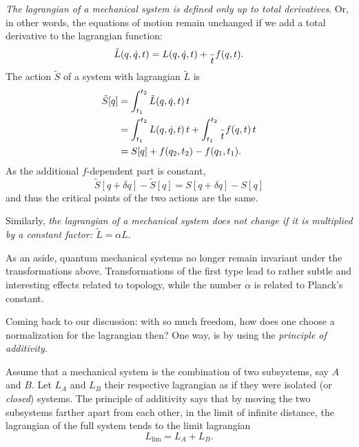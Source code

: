 \documentclass[english,fontsize=11pt,paper=a5,oneside]{scrbook}
\let\d\relax
\DeclareMathOperator{\d}{d}
\theoremstyle{definition}
\newenvironment{remark}
  {\pushQED{\qed}\renewcommand{\qedsymbol}{$\lozenge$}\remarkx}
  {\popQED\endremarkx}
\begin{document}
\begin{remark}\label{rmk:manylagrangians}
    \emph{The lagrangian of a mechanical system is defined only up to total derivatives}.
    Or, in other words, the equations of motion remain unchanged if we add a total derivative to the lagrangian function:
    \begin{equation}
        \tilde L(q,\dot q, t) = L(q, \dot q, t) + \frac{\d}{\d t} f(q,t).
    \end{equation}
    The action $\tilde S$ of a system with lagrangian $\tilde L$ is
    \begin{align}
        \tilde S[q] &= \int_{t_1}^{t_2} \tilde L(q, \dot q, t) \,\d t \\
        &= \int_{t_1}^{t_2} L(q, \dot q, t) \,\d t + \int_{t_1}^{t_2} \frac{\d}{\d t} f(q,t) \,\d t \\
        &= S[q] + f(q_2, t_2) - f(q_1, t_1).
    \end{align}
    As the additional $f$-dependent part is constant,
    \begin{equation}
        \tilde S[q+\delta q] - \tilde S[q]
        = S[q+\delta q] - S[q]
    \end{equation}
    and thus the critical points of the two actions are the same.

    Similarly, \emph{the lagrangian of a mechanical system does not change if it is multiplied by a constant factor: $\tilde L = \alpha L$}.

    As an aside, quantum mechanical systems no longer remain invariant under the transformations above. Transformations of the first type lead to rather subtle and interesting effects related to topology, while the number $\alpha$ is related to Planck's constant. 
    \medskip

    Coming back to our discussion: with so much freedom, how does one choose a normalization for the lagrangian then?
    One way, is by using the \emph{principle of additivity}.
    \begin{tcolorbox}
        Assume that a mechanical system is the combination of two subsystems, say $A$ and $B$.
        Let $L_A$ and $L_B$ their respective lagrangian as if they were isolated (or \emph{closed}) systems.
        The principle of additivity says that by moving the two subsystems farther apart from each other, in the limit of infinite distance, the lagrangian of the full system tends to the limit lagrangian
        \begin{equation}
            L_{\lim} = L_A + L_B.
        \end{equation}
    \end{tcolorbox}
\end{remark}
\end{document}
